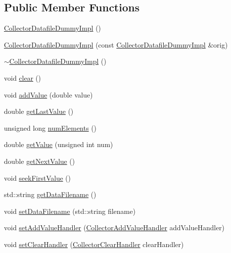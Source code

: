 \subsection*{Public Member Functions}
\begin{DoxyCompactItemize}
\item 
\hyperlink{class_collector_datafile_dummy_impl_a7ce0478aa682707efd786bea24536d2a}{Collector\+Datafile\+Dummy\+Impl} ()
\item 
\hyperlink{class_collector_datafile_dummy_impl_adfef3c2f2f37459cde3ea8f33030ae49}{Collector\+Datafile\+Dummy\+Impl} (const \hyperlink{class_collector_datafile_dummy_impl}{Collector\+Datafile\+Dummy\+Impl} \&orig)
\item 
\hyperlink{class_collector_datafile_dummy_impl_adafa9e9381c53566ad99fb72ae221f09}{$\sim$\+Collector\+Datafile\+Dummy\+Impl} ()
\item 
void \hyperlink{class_collector_datafile_dummy_impl_a752997589537d0a995da508194fabf7d}{clear} ()
\item 
void \hyperlink{class_collector_datafile_dummy_impl_abf282948e13154ca6a0222508b81c78b}{add\+Value} (double value)
\item 
double \hyperlink{class_collector_datafile_dummy_impl_a8016186fea2815530de9dfa77e9d69ac}{get\+Last\+Value} ()
\item 
unsigned long \hyperlink{class_collector_datafile_dummy_impl_a08cb7f0324844c744b41068ba1bf8d7a}{num\+Elements} ()
\item 
double \hyperlink{class_collector_datafile_dummy_impl_a84eb10b49223b402897c466f93dc1bcf}{get\+Value} (unsigned int num)
\item 
double \hyperlink{class_collector_datafile_dummy_impl_a362d8bf7fee03c319239c994a01cf1ae}{get\+Next\+Value} ()
\item 
void \hyperlink{class_collector_datafile_dummy_impl_a47f415dda26201345746697f700ef1b5}{seek\+First\+Value} ()
\item 
std\+::string \hyperlink{class_collector_datafile_dummy_impl_a33a261f553b05c9c39aa46e1222e4918}{get\+Data\+Filename} ()
\item 
void \hyperlink{class_collector_datafile_dummy_impl_aa2f236e5351f9a438aa7cf8734623758}{set\+Data\+Filename} (std\+::string filename)
\item 
void \hyperlink{class_collector_datafile_dummy_impl_abe4a4a292ae8860d25096bf7184d4a43}{set\+Add\+Value\+Handler} (\hyperlink{_collector__if_8h_ab97c9a368c50eb9e00cb4772e46ff38a}{Collector\+Add\+Value\+Handler} add\+Value\+Handler)
\item 
void \hyperlink{class_collector_datafile_dummy_impl_a1f50e119433718cdd3b3a6b1855e6117}{set\+Clear\+Handler} (\hyperlink{_collector__if_8h_ad22205bb584ed3e0db55fc265a5fe1f4}{Collector\+Clear\+Handler} clear\+Handler)
\end{DoxyCompactItemize}


